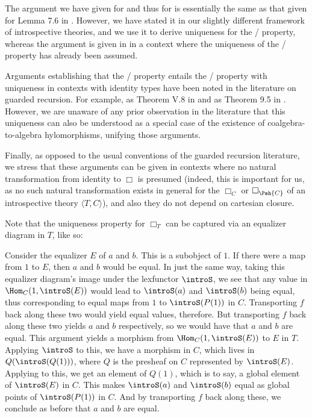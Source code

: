 \begin{remark}
The argument we have given for  and thus for  is essentially the same as that given for Lemma 7.6 in \autocite{birkedal2011first}. However, we have stated it in our slightly different framework of introspective theories, and we use it to derive uniqueness for the \Loeb/ property, whereas the argument is given in \autocite{birkedal2011first} in a context where the uniqueness of the \Loeb/ property has already been assumed.

Arguments establishing that the \Loeb/ property entails the \Loeb/ property with uniqueness in contexts with identity types have been noted in the literature on guarded recursion. For example, as Theorem V.8 in \autocite{birkedal2013universes} and as Theorem 9.5 in \autocite{birkedal2021Multimodal}. However, we are unaware of any prior observation in the literature that this uniqueness can also be understood as a special case of the existence of coalgebra-to-algebra hylomorphisms, unifying those arguments.

Finally, as opposed to the usual conventions of the guarded recursion literature, we stress that these arguments can be given in contexts where no natural transformation from identity to $\Box$ is presumed (indeed, this is important for us, as no such natural transformation exists in general for the $\Box_C$ or $\Box_{\Psh{C}}$ of an introspective theory $\langle T, C \rangle$), and also they do not depend on cartesian closure.
\end{remark}


Note that the uniqueness property for $\Box_T$ can be captured via an equalizer diagram in $T$, like so: 

Consider the equalizer $E$ of $a$ and $b$. This is a subobject of $1$. If there were a map from $1$ to $E$, then $a$ and $b$ would be equal. In just the same way, taking this equalizer diagram's image under the lexfunctor $\introS$, we see that any value in $\Hom_C(1, \introS(E))$ would lead to $\introS(a)$ and $\introS(b)$ being equal, thus corresponding to equal maps from $1$ to $\introS(P(1))$ in $C$. Transporting $f$ back along these two would yield equal values, therefore. But transporting $f$ back along these two yields $a$ and $b$ respectively, so we would have that $a$ and $b$ are equal. This argument yields a morphism from $\Hom_C(1, \introS(E))$ to $E$ in $T$. Applying $\introS$ to this, we have a morphism in $C$, which lives in $Q(\introS(Q(1)))$, where $Q$ is the presheaf on $C$ represented by $\introS(E)$. Applying  to this, we get an element of $Q(1)$, which is to say, a global element of $\introS(E)$ in $C$. This makes $\introS(a)$ and $\introS(b)$ equal as global points of $\introS(P(1))$ in $C$. And by transporting $f$ back along these, we conclude as before that $a$ and $b$ are equal. 

